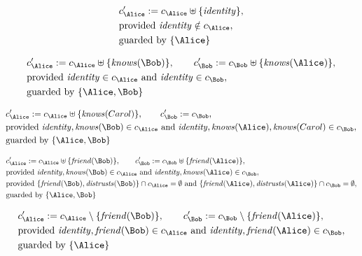 \begin{align*}
&
c'_
{
\Alice
}
 := 
c_
{
\Alice
}
 \uplus 
\{
\mathit{
identity
}
\}
,\\
&
\text{provided } 
\mathit{
identity
}
 \notin c_
{
\Alice
}
,\\
&
\text{guarded by } \{
\Alice
\}
\end{align*}

\begin{align*}
&
c'_
{
\Alice
}
 := 
c_
{
\Alice
}
 \uplus 
\{
\mathit{
knows
}
(
\Bob
)
\}
, \qquad 
c'_
{
\Bob
}
 := 
c_
{
\Bob
}
 \uplus 
\{
\mathit{
knows
}
(
\Alice
)
\}
,\\
&
\text{provided } 
\mathit{
identity
}
 \in c_
{
\Alice
}
 \text{ and } 
\mathit{
identity
}
 \in c_
{
\Bob
}
,\\
&
\text{guarded by } \{
\Alice
,
\Bob
\}
\end{align*}

\begin{align*}
&
c'_
{
\Alice
}
 := 
c_
{
\Alice
}
 \uplus 
\{
\mathit{
knows
}
(
Carol
)
\}
, \qquad 
c'_
{
\Bob
}
 := 
c_
{
\Bob
}
,\\
&
\text{provided } 
\mathit{
identity
}
,
\mathit{
knows
}
(
\Bob
)
 \in c_
{
\Alice
}
 \text{ and } 
\mathit{
identity
}
,
\mathit{
knows
}
(
\Alice
)
,
\mathit{
knows
}
(
Carol
)
 \in c_
{
\Bob
}
,\\
&
\text{guarded by } \{
\Alice
,
\Bob
\}
\end{align*}

\begin{align*}
&
c'_
{
\Alice
}
 := 
c_
{
\Alice
}
 \uplus 
\{
\mathit{
friend
}
(
\Bob
)
\}
, \qquad 
c'_
{
\Bob
}
 := 
c_
{
\Bob
}
 \uplus 
\{
\mathit{
friend
}
(
\Alice
)
\}
,\\
&
\text{provided } 
\mathit{
identity
}
,
\mathit{
knows
}
(
\Bob
)
 \in c_
{
\Alice
}
 \text{ and } 
\mathit{
identity
}
,
\mathit{
knows
}
(
\Alice
)
 \in c_
{
\Bob
}
,\\
&
\text{provided } 
\{
\mathit{
friend
}
(
\Bob
)
,
\mathit{
distrusts
}
(
\Bob
)
\}
 \cap c_
{
\Alice
}
 = \emptyset
 \text{ and } 
\{
\mathit{
friend
}
(
\Alice
)
,
\mathit{
distrusts
}
(
\Alice
)
\}
 \cap c_
{
\Bob
}
 = \emptyset
,\\
&
\text{guarded by } \{
\Alice
,
\Bob
\}
\end{align*}

\begin{align*}
&
c'_
{
\Alice
}
 := 
c_
{
\Alice
}
 \setminus 
\{
\mathit{
friend
}
(
\Bob
)
\}
, \qquad 
c'_
{
\Bob
}
 := 
c_
{
\Bob
}
 \setminus 
\{
\mathit{
friend
}
(
\Alice
)
\}
,\\
&
\text{provided } 
\mathit{
identity
}
,
\mathit{
friend
}
(
\Bob
)
 \in c_
{
\Alice
}
 \text{ and } 
\mathit{
identity
}
,
\mathit{
friend
}
(
\Alice
)
 \in c_
{
\Bob
}
,\\
&
\text{guarded by } \{
\Alice
\}
\end{align*}
